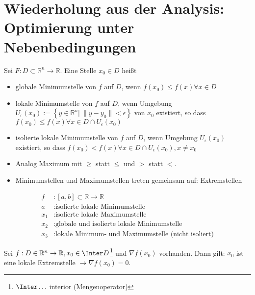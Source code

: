 \section{Wiederholung aus der Analysis: Optimierung unter Nebenbedingungen}
\begin{defi}
Sei $F:D\subset\mathbb{R}^n\rightarrow\mathbb{R}$. Eine Stelle $x_0\in D$ heißt
\begin{itemize}
  \item globale Minimumstelle von $f$ auf $D$, wenn $f(x_0)\le f(x)\forall x\in D$
  \item lokale Minimumstelle von $f$ auf $D$, wenn Umgebung $U_{\epsilon}(x_0):=\left\{y\in\mathbb{R}^n|\ \|y-y_0\|<\epsilon\right\}$ von $x_0$ existiert, so dass $f(x_0)\le
  f(x)\forall x\in D\cap U_{\epsilon}(x_0)$
  \item isolierte lokale Minimumstelle von $f$ auf $D$, wenn Umgebung $U_{\epsilon}(x_0)$ existiert, so dass $f(x_0)<f(x)\forall x\in D\cap U_{\epsilon}(x_0), x\neq
  x_0$
  \item Analog Maximum mit $\ge$ statt $\le$ und $>$ statt $<$.
  \item Minimumstellen und Maximumstellen treten gemeinsam auf: Extremstellen
\end{itemize}
\end{defi}
\begin{exmp}\hspace{1cm}
\begin{minipage}[c][][c]{0.3\textwidth}
\centering

\end{minipage}
\hfill
\begin{minipage}[c][][c]{0.7\textwidth}
\begin{align*}
f &: [a,b]\subset\mathbb{R}\rightarrow \mathbb{R}\\
a &: \text{isolierte lokale Minimumstelle}\\
x_1 &: \text{isolierte lokale Maximumstelle}\\
x_2 &: \text{globale und isolierte lokale Minimumstelle}\\
x_3 &: \text{lokale Minimum- und Maximumstelle (nicht isoliert)}
\end{align*}
\end{minipage}
\end{exmp}
\begin{satz}\label{satz:1}
Sei $f:D\in\mathbb{R}^n\rightarrow\mathbb{R}, x_0\in\Inter D$\footnote{$\Inter\ldots $ interior (Mengenoperator)} und $\nabla f(x_0)$ vorhanden. Dann gilt: $x_0$ ist eine lokale
Extremstelle $\rightarrow \nabla f(x_0)=0$.
\end{satz}
